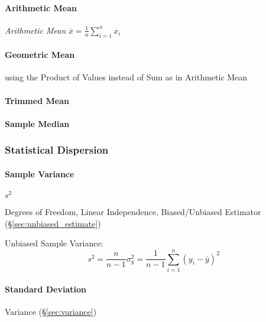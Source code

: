 \paragraph{Arithmetic Mean}\label{sec:arithmetic_mean}\hfill

\emph{Arithmetic Mean} $\overline{x} = \frac{1}{n}\sum_{i=1}^n x_i$



\paragraph{Geometric Mean}\label{sec:geometric_mean}\hfill

using the Product of Values instead of Sum as in Arithmetic Mean



\paragraph{Trimmed Mean}\label{sec:trimmed_mean}\hfill

\paragraph{Sample Median}\label{sec:median}\hfill



\subsubsection{Statistical Dispersion}\label{sec:statistical_dispersion}

\paragraph{Sample Variance}\label{sec:variability}\hfill

$s^2$

Degrees of Freedom, Linear Independence, Biased/Unbiased Estimator
(\S\ref{sec:unbiased_estimate})

Unbiased Sample Variance:
\[
  s^2 = \frac{n}{n-1}\sigma^2_y =
  \frac{1}{n-1} \sum_{i=1}^n (y_i - \overline{y})^2
\]



\paragraph{Standard Deviation}\label{sec:standard_deviation}\hfill

Variance (\S\ref{sec:variance})

